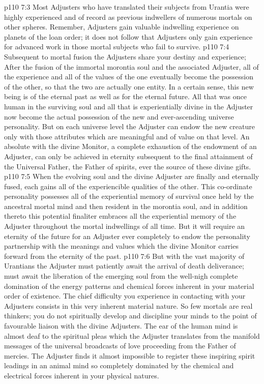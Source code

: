 \vs p110 7:3 Most Adjusters who have translated their subjects from Urantia were highly experienced and of record as previous indwellers of numerous mortals on other spheres. Remember, Adjusters gain valuable indwelling experience on planets of the loan order; it does not follow that Adjusters only gain experience for advanced work in those mortal subjects who fail to survive.
\vs p110 7:4 \pc Subsequent to mortal fusion the Adjusters share your destiny and experience;  After the fusion of the immortal morontia soul and the associated Adjuster, all of the experience and all of the values of the one eventually become the possession of the other, so that the two are actually one entity. In a certain sense, this new being is of the eternal past as well as for the eternal future. All that was once human in the surviving soul and all that is experientially divine in the Adjuster now become the actual possession of the new and ever\hyp{}ascending universe personality. But on each universe level the Adjuster can endow the new creature only with those attributes which are meaningful and of value on that level. An absolute  with the divine Monitor, a complete exhaustion of the endowment of an Adjuster, can only be achieved in eternity subsequent to the final attainment of the Universal Father, the Father of spirits, ever the source of these divine gifts.
\vs p110 7:5 When the evolving soul and the divine Adjuster are finally and eternally fused, each gains all of the experiencible qualities of the other. This co\hyp{}ordinate personality possesses all of the experiential memory of survival once held by the ancestral mortal mind and then resident in the morontia soul, and in addition thereto this potential finaliter embraces all the experiential memory of the Adjuster throughout the mortal indwellings of all time. But it will require an eternity of the future for an Adjuster ever completely to endow the personality partnership with the meanings and values which the divine Monitor carries forward from the eternity of the past.
\vs p110 7:6 \pc But with the vast majority of Urantians the Adjuster must patiently await the arrival of death deliverance; must await the liberation of the emerging soul from the well\hyp{}nigh complete domination of the energy patterns and chemical forces inherent in your material order of existence. The chief difficulty you experience in contacting with your Adjusters consists in this very inherent material nature. So few mortals are real thinkers; you do not spiritually develop and discipline your minds to the point of favourable liaison with the divine Adjusters. The ear of the human mind is almost deaf to the spiritual pleas which the Adjuster translates from the manifold messages of the universal broadcasts of love proceeding from the Father of mercies. The Adjuster finds it almost impossible to register these inspiring spirit leadings in an animal mind so completely dominated by the chemical and electrical forces inherent in your physical natures.
